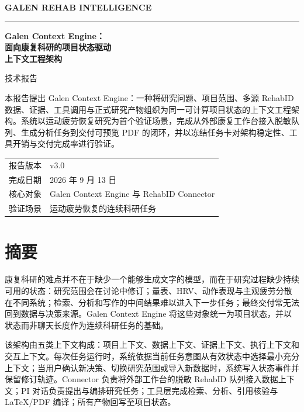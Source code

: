 \documentclass[10pt,a4paper]{article}
\begin{document}
\begin{titlepage}
\thispagestyle{empty}
\vspace*{1.55cm}
{\sffamily\large\bfseries GALEN REHAB INTELLIGENCE\par}
\vspace{0.2cm}
\rule{\linewidth}{1.15pt}\par
\vspace{1.25cm}
{\fontsize{27}{35}\selectfont\bfseries
Galen Context Engine：\\
面向康复科研的项目状态驱动\\
上下文工程架构\par}
\vspace{0.55cm}
{\Large 技术报告\par}
\vspace{1.18cm}
\noindent\begin{minipage}{0.9\linewidth}
\large
本报告提出 Galen Context Engine：一种将研究问题、项目范围、多源 RehabID 数据、证据、工具调用与正式研究产物组织为同一可计算项目状态的上下文工程架构。系统以运动疲劳恢复研究为首个验证场景，完成从外部康复工作台接入脱敏队列、生成分析任务到交付可预览 PDF 的闭环，并以冻结任务卡对架构稳定性、工具开销与交付完成率进行验证。
\end{minipage}

\vfill
\begin{tabularx}{\linewidth}{@{}lY@{}}
\toprule
报告版本 & v3.0 \\
完成日期 & 2026 年 9 月 13 日 \\
核心对象 & Galen Context Engine 与 RehabID Connector \\
验证场景 & 运动疲劳恢复的连续科研任务 \\
\bottomrule
\end{tabularx}
\end{titlepage}

\section*{摘要}
康复科研的难点并不在于缺少一个能够生成文字的模型，而在于研究过程缺少持续可用的状态：研究范围会在讨论中修订；量表、HRV、动作表现与主观疲劳分散在不同系统；检索、分析和写作的中间结果难以进入下一步任务；最终交付常无法回到数据与决策来源。Galen Context Engine 将这些对象统一为项目状态，并以状态而非聊天长度作为连续科研任务的基础。

该架构由五类上下文构成：项目上下文、数据上下文、证据上下文、执行上下文和交互上下文。每次任务运行时，系统依据当前任务意图从有效状态中选择最小充分上下文；当用户确认新决策、切换研究范围或导入新数据时，系统写入状态事件并保留修订轨迹。Connector 负责将外部工作台的脱敏 RehabID 队列接入数据上下文；PI 对话负责提出与编排研究任务；工具层完成检索、分析、引用核验与 LaTeX/PDF 编译；所有产物回写至项目状态。
\end{document}
